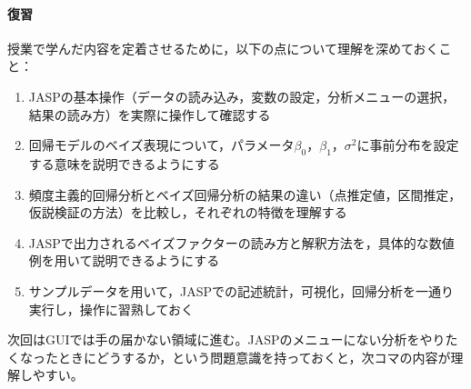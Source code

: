 \paragraph{復習}
授業で学んだ内容を定着させるために，以下の点について理解を深めておくこと：
\begin{enumerate}
  \item JASPの基本操作（データの読み込み，変数の設定，分析メニューの選択，結果の読み方）を実際に操作して確認する
  \item 回帰モデルのベイズ表現について，パラメータ$\beta_0$，$\beta_1$，$\sigma^2$に事前分布を設定する意味を説明できるようにする
  \item 頻度主義的回帰分析とベイズ回帰分析の結果の違い（点推定値，区間推定，仮説検証の方法）を比較し，それぞれの特徴を理解する
  \item JASPで出力されるベイズファクターの読み方と解釈方法を，具体的な数値例を用いて説明できるようにする
  \item サンプルデータを用いて，JASPでの記述統計，可視化，回帰分析を一通り実行し，操作に習熟しておく
\end{enumerate}
次回はGUIでは手の届かない領域に進む。JASPのメニューにない分析をやりたくなったときにどうするか，という問題意識を持っておくと，次コマの内容が理解しやすい。
